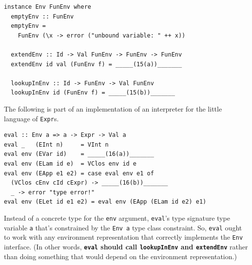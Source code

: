 \documentclass[addpoints]{exam}
\begin{document}
\begin{questions}
\begin{verbatim}
instance Env FunEnv where
  emptyEnv :: FunEnv
  emptyEnv =
    FunEnv (\x -> error ("unbound variable: " ++ x))

  extendEnv :: Id -> Val FunEnv -> FunEnv -> FunEnv
  extendEnv id val (FunEnv f) = _____(15(a))_______
    
  lookupInEnv :: Id -> FunEnv -> Val FunEnv
  lookupInEnv id (FunEnv f) = _____(15(b))_______
\end{verbatim}


\newpage

\question The following is part of an implementation of an interpreter for the little language of \verb|Expr|s.

\begin{verbatim}
eval :: Env a => a -> Expr -> Val a
eval _   (EInt n)     = VInt n
eval env (EVar id)    = _____(16(a))_______
eval env (ELam id e)  = VClos env id e
eval env (EApp e1 e2) = case eval env e1 of
  (VClos cEnv cId cExpr) -> _____(16(b))_______
  _ -> error "type error!"
eval env (ELet id e1 e2) = eval env (EApp (ELam id e2) e1)
\end{verbatim}

Instead of a concrete type for the \verb|env| argument, \verb|eval|'s type signature type variable \verb|a| that's constrained by the \verb|Env a| type class constraint.  So, \verb|eval| ought to work with any environment representation that correctly implements the \verb|Env| interface.  (In other words, \textbf{\texttt{eval} should call \texttt{lookupInEnv} and \texttt{extendEnv}} rather than doing something that would depend on the environment representation.)


\end{questions}
\end{document}
